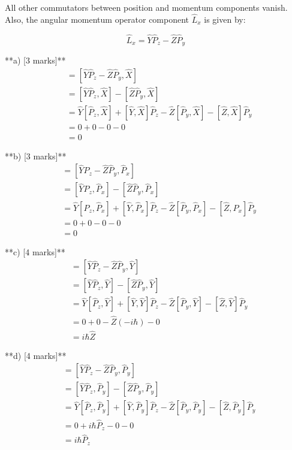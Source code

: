 \documentclass{article}
\begin{document}
All other commutators between position and momentum components vanish. Also, the angular momentum operator component $\hat{L}_x$ is given by:

\begin{equation*}
\hat{L}_x = \hat{Y}\hat{P}_z - \hat{Z}\hat{P}_y
\end{equation*}


**a)  [3 marks]**
\begin{align*}
[\hat{L}_x, \hat{X}] &= [\hat{Y}\hat{P}_z - \hat{Z}\hat{P}_y, \hat{X}] \\
&= [\hat{Y}\hat{P}_z, \hat{X}] - [\hat{Z}\hat{P}_y, \hat{X}] \\
&= \hat{Y}[\hat{P}_z, \hat{X}] + [\hat{Y}, \hat{X}]\hat{P}_z - \hat{Z}[\hat{P}_y, \hat{X}] - [\hat{Z}, \hat{X}]\hat{P}_y \\
&= 0 + 0 - 0 - 0 \\
&= 0 
\end{align*}

**b)  [3 marks]**
\begin{align*}
[\hat{L}_x, \hat{P}_x] &= [\hat{Y}\hat{P}_z - \hat{Z}\hat{P}_y, \hat{P}_x] \\
&= [\hat{Y}\hat{P}_z, \hat{P}_x] - [\hat{Z}\hat{P}_y, \hat{P}_x] \\
&= \hat{Y}[\hat{P}_z, \hat{P}_x] + [\hat{Y}, \hat{P}_x]\hat{P}_z - \hat{Z}[\hat{P}_y, \hat{P}_x] - [\hat{Z}, \hat{P}_x]\hat{P}_y \\
&= 0 + 0 - 0 - 0 \\
&= 0
\end{align*}

**c)  [4 marks]**
\begin{align*}
[\hat{L}_x, \hat{Y}] &= [\hat{Y}\hat{P}_z - \hat{Z}\hat{P}_y, \hat{Y}] \\
&= [\hat{Y}\hat{P}_z, \hat{Y}] - [\hat{Z}\hat{P}_y, \hat{Y}] \\
&= \hat{Y}[\hat{P}_z, \hat{Y}] + [\hat{Y}, \hat{Y}]\hat{P}_z - \hat{Z}[\hat{P}_y, \hat{Y}] - [\hat{Z}, \hat{Y}]\hat{P}_y \\
&= 0 + 0 - \hat{Z}(-i\hbar) - 0 \\
&= i\hbar \hat{Z}
\end{align*}

**d)  [4 marks]**
\begin{align*}
[\hat{L}_x, \hat{P}_y] &= [\hat{Y}\hat{P}_z - \hat{Z}\hat{P}_y, \hat{P}_y] \\
&= [\hat{Y}\hat{P}_z, \hat{P}_y] - [\hat{Z}\hat{P}_y, \hat{P}_y] \\
&= \hat{Y}[\hat{P}_z, \hat{P}_y] + [\hat{Y}, \hat{P}_y]\hat{P}_z - \hat{Z}[\hat{P}_y, \hat{P}_y] - [\hat{Z}, \hat{P}_y]\hat{P}_y \\
&= 0 + i\hbar \hat{P}_z - 0 - 0 \\
&= i\hbar \hat{P}_z
\end{align*}
\end{document}
